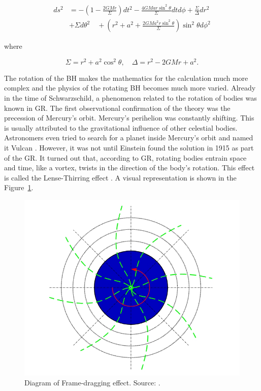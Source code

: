 \documentclass[fleqn,usenatbib]{mnras}
\begin{document}
\begin{equation}
	\begin{split}
		ds^2 &= -\left( 1 - \frac{2GM r}{\Sigma} \right) dt^2 
		- \frac{4GM a r \sin^2\theta}{\Sigma} dt d\phi 
		+ \frac{\Sigma}{\Delta} dr^2 \\
		&+ \Sigma d\theta^2 \quad + \left( r^2 + a^2 + \frac{2GM a^2 r \sin^2\theta}{\Sigma} \right) \sin^2\theta d\phi^2
	\end{split}
	\label{eq:kerr_metric}
\end{equation}

where

\begin{equation*}
	\Sigma = r^2 + a^2 \cos^2\theta, \quad
	\Delta = r^2 - 2GM r + a^2.
\end{equation*}

The rotation of the BH makes the mathematics for the calculation much more complex and the physics of the rotating BH becomes much more varied. Already in the time of Schwarzschild, a phenomenon related to the rotation of bodies was known in GR. The first observational confirmation of the theory was the precession of Mercury's orbit. Mercury's perihelion was constantly shifting. This is usually attributed to the gravitational influence of other celestial bodies. Astronomers even tried to search for a planet inside Mercury's orbit and named it Vulcan \citet{weinstein2014}. However, it was not until Einstein found the solution in 1915 as part of the GR. It turned out that, according to GR, rotating bodies entrain space and time, like a vortex, twists in the direction of the body's rotation. This effect is called the Lense-Thirring effect \citet{pfister2007}. A visual representation is shown in the Figure~\ref{fig:lense-thirring}.

\begin{figure} %
	\includegraphics[width=\columnwidth]{figures/lense-thirring.png}
	\caption{Diagram of Frame-dragging effect. Source: \citet{zhang2024}.}
	\label{fig:lense-thirring}
\end{figure}
\end{document}
